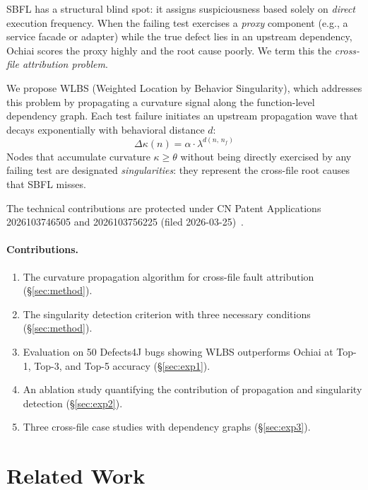 \documentclass[acmtog]{acmart}
\begin{document}
SBFL has a structural blind spot: it assigns suspiciousness based solely on
\emph{direct} execution frequency. When the failing test exercises a \emph{proxy}
component (e.g., a service facade or adapter) while the true defect lies in an
upstream dependency, Ochiai scores the proxy highly and the root cause poorly.
We term this the \emph{cross-file attribution problem}.

We propose WLBS (Weighted Location by Behavior Singularity), which addresses
this problem by propagating a curvature signal along the function-level dependency
graph. Each test failure initiates an upstream propagation wave that decays
exponentially with behavioral distance $d$:
\[
  \Delta\kappa(n) = \alpha \cdot \lambda^{d(n,\,n_f)}
\]
Nodes that accumulate curvature $\kappa \geq \theta$ without being directly
exercised by any failing test are designated \emph{singularities}: they represent
the cross-file root causes that SBFL misses.

The technical contributions are protected under CN Patent Applications
2026103746505 and 2026103756225 (filed 2026-03-25)~\cite{huang2026patent}.

\paragraph{Contributions.}
\begin{enumerate}
  \item The curvature propagation algorithm for cross-file fault attribution (\S\ref{sec:method}).
  \item The singularity detection criterion with three necessary conditions (\S\ref{sec:method}).
  \item Evaluation on 50 Defects4J bugs showing WLBS outperforms Ochiai at
        Top-1, Top-3, and Top-5 accuracy (\S\ref{sec:exp1}).
  \item An ablation study quantifying the contribution of propagation and
        singularity detection (\S\ref{sec:exp2}).
  \item Three cross-file case studies with dependency graphs (\S\ref{sec:exp3}).
\end{enumerate}

\section{Related Work}\label{sec:related}
\end{document}
